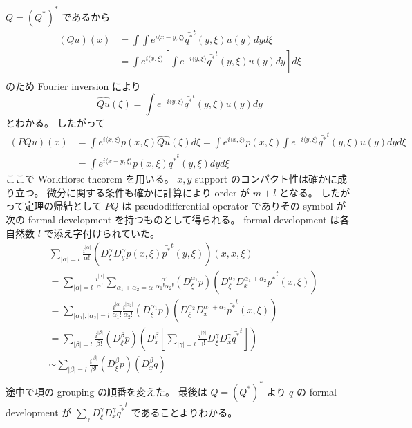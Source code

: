 \begin{Proof}
\itemprof
  \(Q = (Q^*)^*\) であるから
  \begin{align*}
    (Qu)(x)
    &= \int\int e^{i \langle x-y ,\xi \rangle} \bar{q^*}^t(y,\xi) u(y) dy d\xi \\
    &= \int e^{i\langle x,\xi \rangle} \left[\int e^{-i\langle y,\xi \rangle} \bar{q^*}^t(y,\xi) u(y) dy \right] d\xi \\
  \end{align*}
  のため Fourier inversion により
  \[
    \widehat{Qu}(\xi) = \int e^{-i \langle y,\xi \rangle} \bar{q^*}^t(y,\xi) u(y) dy
  \]
  とわかる。
  したがって
  \begin{align*}
    (PQu)(x)
    &= \int e^{i \langle x ,\xi \rangle} p(x,\xi) \widehat{Qu}(\xi) d\xi
      = \int e^{i \langle x ,\xi \rangle} p(x,\xi) \int e^{-i \langle y,\xi \rangle} \bar{q^*}^t(y,\xi) u(y) dy d\xi \\
    &= \int e^{i \langle x-y ,\xi \rangle} p(x,\xi) \bar{q^*}^t(y,\xi) dy d\xi
  \end{align*}
  ここで WorkHorse theorem を用いる。
\itemthen
  \(x,y\)-support のコンパクト性は確かに成り立つ。
  微分に関する条件も確かに計算により order が \(m + l\) となる。
  したがって定理の帰結として \(PQ\) は pseudodifferential operator でありその symbol が次の formal development を持つものとして得られる。
  formal development は各自然数 \(l\) で添え字付けられていた。
  \begin{align*}
    &\sum_{\lvert \alpha \rvert = l} \frac{i^{\lvert \alpha \rvert}}{\alpha !} (D^\alpha_\xi D^\alpha_y p(x,\xi) \bar{p^*}^t(y,\xi))(x,x,\xi) \\
    &= \sum_{\lvert \alpha \rvert = l} \frac{i^{\lvert \alpha \rvert}}{\alpha !}
    \sum_{\alpha_1 + \alpha_2 = \alpha} \frac{\alpha !}{\alpha_1 ! \alpha_2 !} (D^{\alpha_1}_\xi p) (D^{\alpha_2}_\xi D^{\alpha_1 + \alpha_2}_x \bar{p^*}^t(x,\xi)) \\
    &= \sum_{\lvert \alpha_1 \rvert , \lvert \alpha_2 \rvert = l} \frac{i^{\lvert \alpha \rvert }}{\alpha_1 !} \frac{i^{\lvert \alpha_2 \rvert}}{\alpha_2 !} (D^{\alpha_1}_\xi p) (D^{\alpha_2}_\xi D^{\alpha_1 + \alpha_2}_x \bar{p^*}^t(x,\xi)) \\
    &= \sum_{\lvert \beta \rvert = l} \frac{i^{\lvert \beta \rvert}}{\beta !} (D^{\beta}_\xi p) (D^{\beta}_x 
    \left[\sum_{\lvert \gamma \rvert = l} \frac{i^{\lvert \gamma \rvert}}{\gamma !} D^\gamma_\xi D^\gamma_x \bar{q^*}^t \right]) \\
    &\sim \sum_{\lvert \beta \rvert = l} \frac{i^{\lvert \beta \rvert}}{\beta !} (D^{\beta}_\xi p) (D^{\beta}_x q) \\
  \end{align*}
  途中で項の grouping の順番を変えた。
  最後は \(Q =(Q^*)^*\) より \(q\) の formal development が \(\sum_{\gamma} D^\gamma_\xi D^\gamma_x \bar{q^*}^t\) であることよりわかる。
\end{Proof}

